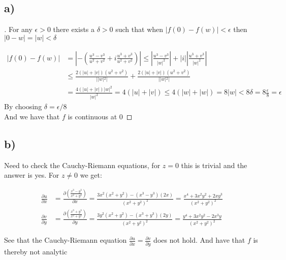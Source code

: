 \documentclass{article}
\begin{document}
  \subsection*{a)}
  \begin{proof}[\unskip \nopunct]
  For any $\epsilon >0$ there exists a $\delta >0$ such that when $|f(0) - f(w)| < \epsilon$ then $|0- w | = |w| < \delta$

  \begin{align*}
    |f(0) - f(w)| &= \left|-\left(  \frac{u^3 - v^3}{u^2 + v^2} + i\frac{u^3 + v^3}{u^2 + v^2}\right)\right| \leq \left| \frac{u^3 -v^3}{|w|^2}\right| + |i|\left| \frac{u^3 + v^3}{|w|^2}\right| \\ 
    &\leq  \frac{2(|u| +|v|)(u^2 +v^2)}{||w|^2|} + \frac{2(|u| + |v|)(u^2 + v^2)}{||w|^2|}\\
    &= \frac{4(|u| + |v|)|w|^2}{|w|^2} = 4(|u| + |v|) \leq 4(|w| + |w|) =  8|w| < 8\delta = 8\frac{\epsilon}{8} = \epsilon
  \end{align*}
By choosing $\delta = \epsilon/8$\\
And we have that $f$ is continuous at 0
  \end{proof}

  
  \subsection*{b)}
  Need to check the Cauchy-Riemann equations, for $z = 0$ this is trivial and the answer is yes. For $z \neq 0$ we get:

  \begin{align*}
    \frac{\partial u}{\partial x} &=\frac{\partial \left(\frac{x^3 - y^3}{x^2 + y^2}\right)}{\partial x} = \frac{3x^2(x^2 + y^2) - (x^3 - y^3)(2x)}{(x^2 + y^2)^2} = \frac{x^4 + 3x^2y^2 + 2xy^3}{(x^2 + y^2)^2}\\
        \frac{\partial v}{\partial y} &=\frac{\partial \left(\frac{x^3 + y^3}{x^2 + y^2}\right)}{\partial y} = \frac{3y^2(x^2 + y^2) - (x^3 + y^3)(2y)}{(x^2 + y^2)^2} = \frac{y^4 + 3x^2y^2 - 2x^3y}{(x^2 + y^2)^2} 
  \end{align*}

See that the Cauchy-Riemann equation $\frac{\partial u}{\partial x} = \frac{\partial v}{\partial y}$ does not hold. And have that $f$ is thereby not analytic
\end{document}
